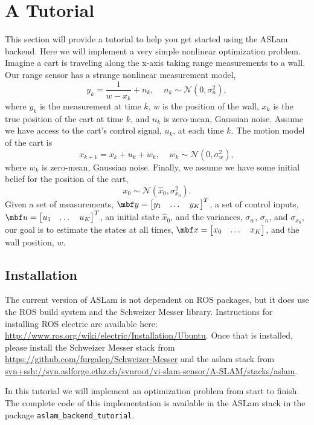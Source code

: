 \documentclass[11pt,a4,oneside]{article}
\newcommand{\txt}[1]{{\footnotesize\texttt{#1}}}
\newcommand{\surl}[1]{{\footnotesize\url{#1}}}
\begin{document}
\section{A Tutorial}
This section will provide a tutorial to help you get started using the ASLam backend. Here we will implement a very simple nonlinear optimization problem. Imagine a cart is traveling along the x-axis taking range measurements to a wall. Our range sensor has a strange nonlinear measurement model,
\begin{equation}
  \label{eq:range-nonlinear}
  y_k = \frac{1}{w - x_k} + n_k,\;\;\;\;n_k \sim \mathcal{N}(0, \sigma_{n}^2),
\end{equation}
where $y_k$ is the measurement at time $k$, $w$ is the position of the wall, $x_k$ is the true position of the cart at time $k$, and $n_k$ is zero-mean, Gaussian noise. Assume we have access to the cart's control signal, $u_k$, at each time $k$. The motion model of the cart is
\begin{equation}
  \label{eq:motion-model}
  x_{k+1} = x_k + u_k + w_k,\;\;\;\; w_k \sim \mathcal{N}(0, \sigma_{w}^2),
\end{equation}
where $w_k$ is zero-mean, Gaussian noise. Finally, we assume we have some initial belief for the position of the cart,
\begin{equation}
  \label{eq:cart-belief}
  x_0 \sim \mathcal{N}(\hat x_0, \sigma_{x_0}^2).
\end{equation}
Given a set of measurements, $\mbf y = \bbm y_1 & \dots & y_K \ebm^T$, a set of control inputs, $\mbf u = \bbm u_1 & \dots & u_K \ebm^T$, an initial state $\hat x_0$, and the variances, $\sigma_w$, $\sigma_n$, and $\sigma_{x_0}$, our goal is to estimate the states at all times, $\mbf x = \bbm x_0 & \dots & x_K \ebm$, and the wall position, $w$.
\subsection{Installation}
The current version of ASLam is not dependent on ROS packages, but it does use the ROS build system and the Schweizer Messer library. Instructions for installing ROS electric are available here: \surl{http://www.ros.org/wiki/electric/Installation/Ubuntu}. Once that is installed, please install the Schweizer Messer stack from \surl{https://github.com/furgalep/Schweizer-Messer} and the aslam stack from \surl{svn+ssh://svn.aslforge.ethz.ch/svnroot/vi-slam-sensor/A-SLAM/stacks/aslam}.

In this tutorial we will implement an optimization problem from start to finish. The complete code of this implementation is available in the ASLam stack in the package \txt{aslam\_backend\_tutorial}.
\end{document}
